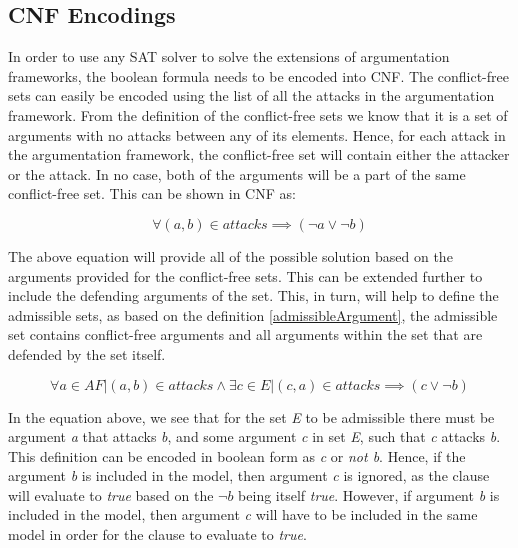 \subsection{CNF Encodings}
In order to use any SAT solver to solve the extensions of argumentation frameworks, the boolean formula needs to be encoded into CNF. The conflict-free sets can easily be encoded using the list of all the attacks in the argumentation framework. From the definition of the conflict-free sets we know that it is a set of arguments with no attacks between any of its elements. Hence, for each attack in the argumentation framework, the conflict-free set will contain either the attacker or the attack. In no case, both of the arguments will be a part of the same conflict-free set. This can be shown in CNF as:

\begin{equation}
	  \forall (a,b) \in attacks \implies (\neg a \lor \neg b)
\end{equation}

The above equation will provide all of the possible solution based on the arguments provided for the conflict-free sets. This can be extended further to include the defending arguments of the set. This, in turn, will help to define the admissible sets, as based on the definition \ref{admissibleArgument}, the admissible set contains conflict-free arguments and all arguments within the set that are defended by the set itself.

\begin{equation}
\forall a \in AF | (a,b) \in attacks \land \exists c \in E | (c,a) \in attacks \implies (c \lor \neg b)
\end{equation}

In the equation above, we see that for the set \textit{E} to be admissible there must be argument \textit{a} that attacks \textit{b}, and some argument \textit{c} in set \textit{E}, such that \textit{c} attacks \textit{b}. This definition can be encoded in boolean form as \textit{c} or \textit{not b}. Hence, if the argument \textit{b} is included in the model, then argument \textit{c} is ignored, as the clause will evaluate to \textit{true} based on the $\neg b$ being itself \textit{true}. However, if argument \textit{b} is included in the model, then argument \textit{c} will have to be included in the same model in order for the clause to evaluate to \textit{true}.